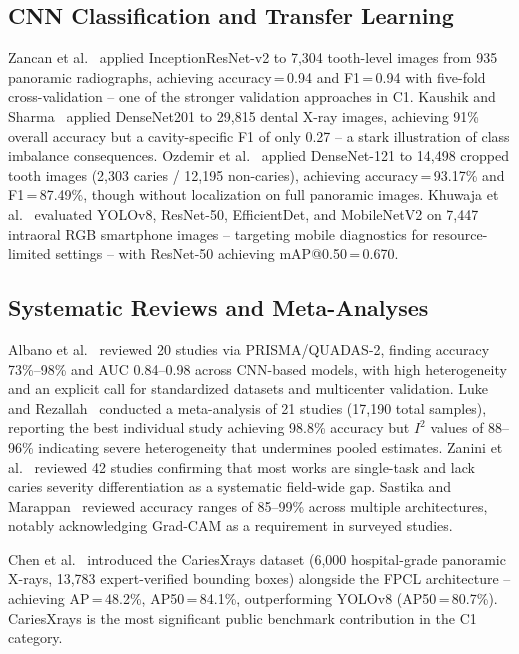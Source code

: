 \documentclass[conference]{IEEEtran}
\begin{document}
\subsection{CNN Classification and Transfer Learning}

Zancan et al.~\cite{zancan2025ai} applied InceptionResNet-v2 to 7,304
tooth-level images from 935 panoramic radiographs, achieving
accuracy\,=\,0.94 and F1\,=\,0.94 with five-fold cross-validation --
one of the stronger validation approaches in C1. Kaushik and
Sharma~\cite{kaushik2025densenet201} applied DenseNet201 to 29,815
dental X-ray images, achieving 91\% overall accuracy but a
cavity-specific F1 of only 0.27 -- a stark illustration of class
imbalance consequences. Ozdemir et al.~\cite{ozdemir2026enhanced}
applied DenseNet-121 to 14,498 cropped tooth images (2,303 caries /
12,195 non-caries), achieving accuracy\,=\,93.17\% and F1\,=\,87.49\%,
though without localization on full panoramic images. Khuwaja et
al.~\cite{khuwaja2024ai} evaluated YOLOv8, ResNet-50, EfficientDet, and
MobileNetV2 on 7,447 intraoral RGB smartphone images -- targeting mobile
diagnostics for resource-limited settings -- with ResNet-50 achieving
mAP@0.50\,=\,0.670.

\subsection{Systematic Reviews and Meta-Analyses}

Albano et al.~\cite{albano2024artificial} reviewed 20 studies via
PRISMA/QUADAS-2, finding accuracy 73\%--98\% and AUC 0.84--0.98 across
CNN-based models, with high heterogeneity and an explicit call for
standardized datasets and multicenter validation. Luke and
Rezallah~\cite{luke2025accuracy} conducted a meta-analysis of 21 studies
(17,190 total samples), reporting the best individual study achieving
98.8\% accuracy but $I^2$ values of 88--96\% indicating severe
heterogeneity that undermines pooled estimates. Zanini et
al.~\cite{zanini2024systematic} reviewed 42 studies confirming that most
works are single-task and lack caries severity differentiation as a
systematic field-wide gap. Sastika and Marappan~\cite{sastika2025ai}
reviewed accuracy ranges of 85--99\% across multiple architectures,
notably acknowledging Grad-CAM as a requirement in surveyed studies.

Chen et al.~\cite{chen2024cariesxrays} introduced the CariesXrays
dataset (6,000 hospital-grade panoramic X-rays, 13,783 expert-verified
bounding boxes) alongside the FPCL architecture -- achieving
AP\,=\,48.2\%, AP50\,=\,84.1\%, outperforming YOLOv8
(AP50\,=\,80.7\%). CariesXrays is the most significant public benchmark
contribution in the C1 category.
\end{document}
